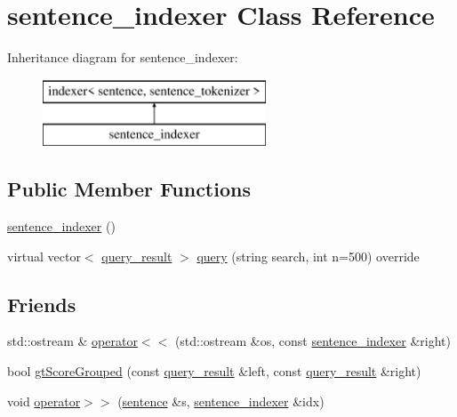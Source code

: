 \hypertarget{classsentence__indexer}{}\section{sentence\+\_\+indexer Class Reference}
\label{classsentence__indexer}
Inheritance diagram for sentence\+\_\+indexer\+:\begin{figure}[H]
\begin{center}
\leavevmode
\includegraphics[height=2.000000cm]{classsentence__indexer}
\end{center}
\end{figure}
\subsection*{Public Member Functions}
\begin{DoxyCompactItemize}
\item 
\hyperlink{classsentence__indexer_a365d5a760a116eb4f48fe8fdbdeb0421}{sentence\+\_\+indexer} ()
\item 
virtual vector$<$ \hyperlink{classquery__result}{query\+\_\+result} $>$ \hyperlink{classsentence__indexer_a039940ff3461bb8fa95b66aa9b5f8496}{query} (string search, int n=500) override
\end{DoxyCompactItemize}
\subsection*{Friends}
\begin{DoxyCompactItemize}
\item 
std\+::ostream \& \hyperlink{classsentence__indexer_ad09f6baaa740dac6056316377c95dfa7}{operator$<$$<$} (std\+::ostream \&os, const \hyperlink{classsentence__indexer}{sentence\+\_\+indexer} \&right)
\item 
bool \hyperlink{classsentence__indexer_a105a138776c9677f92568db3f53d91f2}{gt\+Score\+Grouped} (const \hyperlink{classquery__result}{query\+\_\+result} \&left, const \hyperlink{classquery__result}{query\+\_\+result} \&right)
\item 
void \hyperlink{classsentence__indexer_aad9b25bf223fbb0d7eed5a168cb702ec}{operator$>$$>$} (\hyperlink{classsentence}{sentence} \&s, \hyperlink{classsentence__indexer}{sentence\+\_\+indexer} \&idx)
\end{DoxyCompactItemize}
